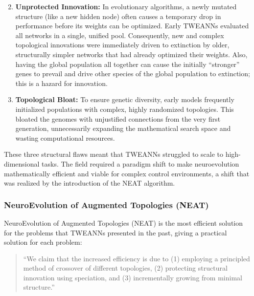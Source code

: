 \begin{enumerate}
    \setcounter{enumi}{1} %
    \item \textbf{Unprotected Innovation:} In evolutionary algorithms, a newly mutated structure (like a new hidden node) often causes a temporary drop in performance before its weights can be optimized. Early TWEANNs evaluated all networks in a single, unified pool. Consequently, new and complex topological innovations were immediately driven to extinction by older, structurally simpler networks that had already optimized their weights. Also, having the global population all together can cause the initially ``stronger'' genes to prevail and drive other species of the global population to extinction; this is a hazard for innovation.
    
    \item \textbf{Topological Bloat:} To ensure genetic diversity, early models frequently initialized populations with complex, highly randomized topologies. This bloated the genomes with unjustified connections from the very first generation, unnecessarily expanding the mathematical search space and wasting computational resources.
\end{enumerate}

These three structural flaws meant that TWEANNs struggled to scale to high-dimensional tasks. The field required a paradigm shift to make neuroevolution mathematically efficient and viable for complex control environments, a shift that was realized by the introduction of the NEAT algorithm.


\subsubsection{NeuroEvolution of Augmented Topologies (NEAT)}

NeuroEvolution of Augmented Topologies (NEAT) is the most efficient solution for the problems that TWEANNs presented in the past, giving a practical solution for each problem: 

\begin{quote}
``We claim that the increased efficiency is due to (1) employing a principled method of crossover of different topologies, (2) protecting structural innovation using speciation, and (3) incrementally growing from minimal structure.'' \cite{stanley2002}
\end{quote}

